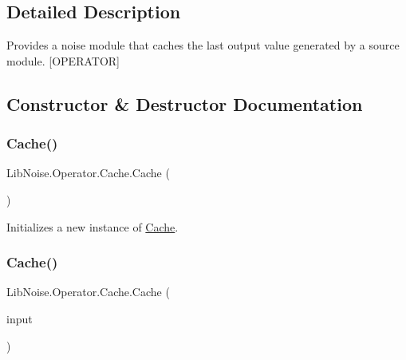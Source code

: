 \subsection{Detailed Description}
Provides a noise module that caches the last output value generated by a source module. \mbox{[}O\+P\+E\+R\+A\+T\+OR\mbox{]} 



\subsection{Constructor \& Destructor Documentation}
\mbox{\label{class_lib_noise_1_1_operator_1_1_cache_a70bbc3a95ad9424f594499a431ddd6a7}} 
\subsubsection{\texorpdfstring{Cache()}{Cache()}\hspace{0.1cm}{\footnotesize\ttfamily [1/2]}}
{\footnotesize\ttfamily Lib\+Noise.\+Operator.\+Cache.\+Cache (\begin{DoxyParamCaption}{ }\end{DoxyParamCaption})}



Initializes a new instance of \hyperlink{class_lib_noise_1_1_operator_1_1_cache}{Cache}. 

\mbox{\label{class_lib_noise_1_1_operator_1_1_cache_afb77c238ebc943cf20c7a4b797d99038}} 
\subsubsection{\texorpdfstring{Cache()}{Cache()}\hspace{0.1cm}{\footnotesize\ttfamily [2/2]}}
{\footnotesize\ttfamily Lib\+Noise.\+Operator.\+Cache.\+Cache (\begin{DoxyParamCaption}\item[{\hyperlink{class_lib_noise_1_1_module_base}{Module\+Base}}]{input }\end{DoxyParamCaption})}



